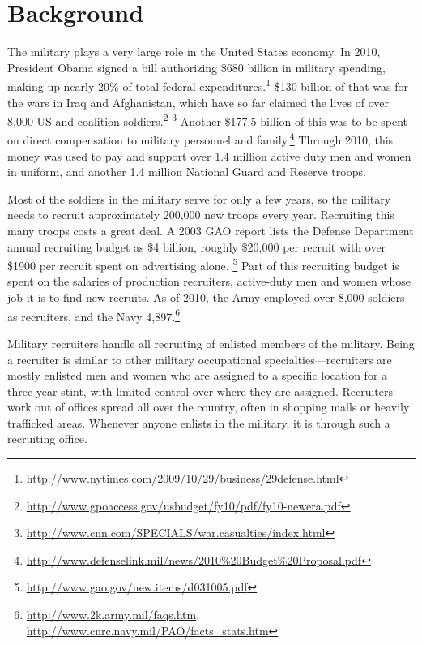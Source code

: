 \documentclass[12pt] {article}
\begin{document}
\section{Background\label{sec:Literature-Review}}
The military plays a very large role in the United States economy.
In 2010, President Obama signed a bill authorizing \$680 billion in
military spending, making up nearly 20\% of total federal expenditures.\footnote{\url{http://www.nytimes.com/2009/10/29/business/29defense.html}} \$130 billion of that was for the wars in Iraq and Afghanistan, which have so far claimed the lives of over 8,000 US and coalition
soldiers.\footnote{\url{http://www.gpoaccess.gov/usbudget/fy10/pdf/fy10-newera.pdf}}
\footnote{\url{http://www.cnn.com/SPECIALS/war.casualties/index.html}
} Another \$177.5 billion of this was to be spent on direct compensation
to military personnel and family.\footnote{\url{http://www.defenselink.mil/news/2010\%20Budget\%20Proposal.pdf}} Through 2010, this money was used to pay and support over
1.4 million active duty men and women in uniform, and another 1.4
million National Guard and Reserve troops. 

Most of the soldiers in the military serve for only a few years, so the military needs
to recruit approximately 200,000 new troops every year. Recruiting this many troops costs a great deal. A 2003 GAO report lists the Defense Department annual recruiting budget as \$4
billion, roughly \$20,000 per recruit with over \$1900 per recruit
spent on advertising alone.%
\footnote{\url{http://www.gao.gov/new.items/d031005.pdf}
} Part of this recruiting budget is spent on the salaries of production
recruiters, active-duty men and women whose job it is to find new
recruits. As of 2010, the Army employed over 8,000 soldiers as recruiters,
and the Navy 4,897.\footnote{\url{http://www.2k.army.mil/faqs.htm}, \url{http://www.cnrc.navy.mil/PAO/facts\_stats.htm}
} 


Military recruiters handle all recruiting of enlisted members of the military. Being a recruiter is similar to other military occupational
specialties---recruiters are mostly enlisted men and women who are
assigned to a specific location for a three year stint, with limited
control over where they are assigned. Recruiters work out of offices
spread all over the country, often in shopping malls or heavily trafficked
areas. Whenever anyone enlists in the military, it is through such
a recruiting office.
\end{document}
